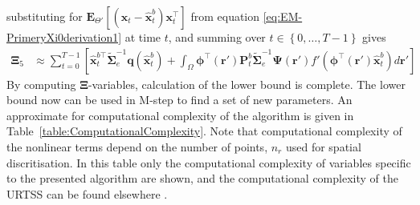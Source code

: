 \documentclass[]{article}
\begin{document}
substituting for $\mathbf E_{\Theta'}\left[(\mathbf x_t - \mathbf  {\hat x}_t^b)\mathbf x_t^\top\right] $ from equation \eqref{eq:EM-PrimeryXi0derivation1} at time $t$, and summing over $t \in \left\lbrace 0, \dots, T-1\right\rbrace $ gives
\begin{align}
\boldsymbol\Xi_{5}&\approx\sum_{t=0}^{T-1}\left[ \mathbf{\hat x}_{t}^{b\top}\tilde{\boldsymbol\Sigma}_e^{-1}\mathbf q(\mathbf{\hat x}_t^b)+\int_\Omega\boldsymbol \phi^\top(\mathbf r') \mathbf P_t^b \tilde{\boldsymbol\Sigma}_e^{-1}  \boldsymbol{\Psi}(\mathbf{r}') f'(\boldsymbol \phi^\top(\mathbf r')\mathbf {\hat x}_t^b) d\mathbf{r}'\right] \label{eq:Xi5Ap}
 \end{align}
By computing $\boldsymbol\Xi$-variables, calculation of the lower bound is complete. The lower bound now can be used in M-step to find a set of new parameters. An approximate for computational complexity of the algorithm is given in Table~\ref{table:ComputationalComplexity}. Note that computational complexity of the nonlinear terms depend on the number of points, $n_r$ used for spatial discritisation.  In this table only the computational complexity of variables specific to the presented algorithm are shown, and the computational complexity of the URTSS can be found elsewhere \cite{Sarkka2010}.
\end{document}
